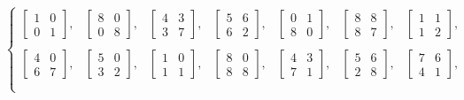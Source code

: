\documentclass[12pt,reqno]{amsart}
\theoremstyle{remark}
\numberwithin{table}{section}
\begin{document}
\begin{equation}
\left\{\begin{array}{llllllll}
\begin{bmatrix}1&0\\0&1 \end{bmatrix}, & 
 \begin{bmatrix}8&0\\0&8 \end{bmatrix},& 
  \begin{bmatrix}4&3\\3&7 \end{bmatrix},&
   \begin{bmatrix}5&6\\6&2 \end{bmatrix},&
    \begin{bmatrix}0&1\\8&0 \end{bmatrix},&
     \begin{bmatrix}8&8\\8&7 \end{bmatrix},& 
      \begin{bmatrix}1&1\\1&2 \end{bmatrix},\\ \\
       \begin{bmatrix}4&0\\6&7 \end{bmatrix}, &
        \begin{bmatrix}5&0\\3&2 \end{bmatrix}, &
         \begin{bmatrix}1&0\\1&1 \end{bmatrix},&
          \begin{bmatrix}8&0\\8&8 \end{bmatrix},&
           \begin{bmatrix}4&3\\7&1 \end{bmatrix},&
            \begin{bmatrix}5&6\\2&8 \end{bmatrix},& 
             \begin{bmatrix}7&6\\4&1 \end{bmatrix},\\ \\

\end{array}
\end{equation}
\end{document}
